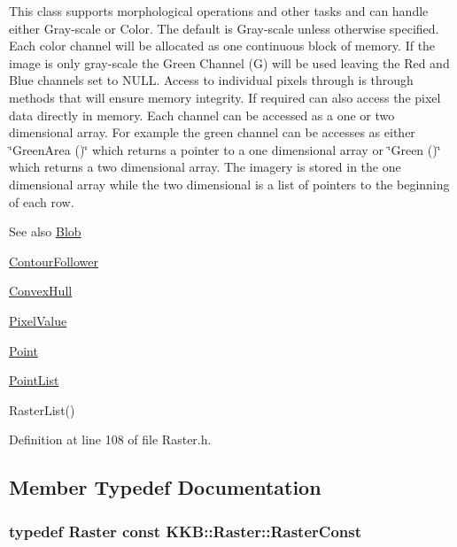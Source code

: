 This class supports morphological operations and other tasks and can handle either Gray-\/scale or Color. The default is Gray-\/scale unless otherwise specified. Each color channel will be allocated as one continuous block of memory. If the image is only gray-\/scale the Green Channel (G) will be used leaving the Red and Blue channels set to N\+U\+LL. Access to individual pixels through is through methods that will ensure memory integrity. If required can also access the pixel data directly in memory. Each channel can be accessed as a one or two dimensional array. For example the green channel can be accesses as either \char`\"{}\+Green\+Area ()\char`\"{} which returns a pointer to a one dimensional array or \char`\"{}\+Green ()\char`\"{} which returns a two dimensional array. The imagery is stored in the one dimensional array while the two dimensional is a list of pointers to the beginning of each row. \begin{DoxySeeAlso}{See also}
\hyperlink{class_k_k_b_1_1_blob}{Blob} 

\hyperlink{class_k_k_b_1_1_contour_follower}{Contour\+Follower} 

\hyperlink{class_k_k_b_1_1_convex_hull}{Convex\+Hull} 

\hyperlink{class_k_k_b_1_1_pixel_value}{Pixel\+Value} 

\hyperlink{class_k_k_b_1_1_point}{Point} 

\hyperlink{class_k_k_b_1_1_point_list}{Point\+List} 

Raster\+List() 
\end{DoxySeeAlso}


Definition at line 108 of file Raster.\+h.



\subsection{Member Typedef Documentation}
\subsubsection[{\texorpdfstring{Raster\+Const}{RasterConst}}]{\setlength{\rightskip}{0pt plus 5cm}typedef {\bf Raster} const {\bf K\+K\+B\+::\+Raster\+::\+Raster\+Const}}\hypertarget{class_k_k_b_1_1_raster_a938ab844ee73af06f79244750f96d3df}{}\label{class_k_k_b_1_1_raster_a938ab844ee73af06f79244750f96d3df}


